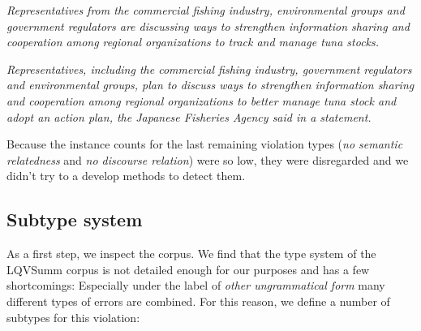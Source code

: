 \documentclass[a4paper,10pt]{scrartcl}
\theoremstyle{style}
\begin{document}
\quad\textit{Representatives from the commercial fishing industry, environmental groups and government regulators are discussing ways to strengthen information sharing and cooperation among regional organizations to track and manage tuna stocks.}

\quad\textit{Representatives, including the commercial fishing industry, government regulators and environmental groups, plan to discuss ways to strengthen information sharing and cooperation among regional organizations to better manage tuna stock and adopt an action plan, the Japanese Fisheries Agency said in a statement.}

Because the instance counts for the last remaining violation types (\textit{no semantic relatedness} and \textit{no discourse relation}) were so low, they were disregarded and we didn't try to a develop methods to detect them.

\subsection{Subtype system}
\label{s_subtypes}

As a first step, we inspect the corpus. We find that the type system of the LQVSumm corpus \citep{valeeva} is not detailed enough for our purposes and has a few shortcomings: Especially under the label of \textit{other ungrammatical form} many different types of errors are combined. For this reason, we define a number of subtypes for this violation:
\end{document}
